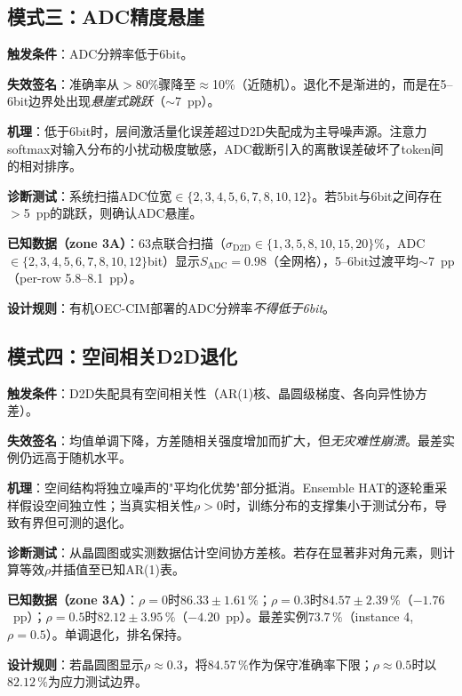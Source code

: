 \subsection{模式三：ADC精度悬崖}
\label{subsec:failure_adc_cliff}

\textbf{触发条件}：ADC分辨率低于6bit。

\textbf{失效签名}：准确率从$>$80\%骤降至$\approx$10\%（近随机）。退化不是渐进的，而是在5--6bit边界处出现\emph{悬崖式跳跃}（$\sim$7~pp）。

\textbf{机理}：低于6bit时，层间激活量化误差超过D2D失配成为主导噪声源。注意力softmax对输入分布的小扰动极度敏感，ADC截断引入的离散误差破坏了token间的相对排序。

\textbf{诊断测试}：系统扫描ADC位宽$\in\{2,3,4,5,6,7,8,10,12\}$。若5bit与6bit之间存在$>$5~pp的跳跃，则确认ADC悬崖。

\textbf{已知数据（zone 3A）}：63点联合扫描（$\sigma_{\mathrm{D2D}}\in\{1,3,5,8,10,15,20\}\%$，ADC$\in\{2,3,4,5,6,7,8,10,12\}$bit）显示$S_{\mathrm{ADC}}=0.98$（全网格），5--6bit过渡平均$\sim$7~pp（per-row 5.8--8.1~pp）。

\textbf{设计规则}：有机OEC-CIM部署的ADC分辨率\emph{不得低于6bit}。

\subsection{模式四：空间相关D2D退化}
\label{subsec:failure_correlated_d2d}

\textbf{触发条件}：D2D失配具有空间相关性（AR(1)核、晶圆级梯度、各向异性协方差）。

\textbf{失效签名}：均值单调下降，方差随相关强度增加而扩大，但\emph{无灾难性崩溃}。最差实例仍远高于随机水平。

\textbf{机理}：空间结构将独立噪声的"平均化优势"部分抵消。Ensemble HAT的逐轮重采样假设空间独立性；当真实相关性$\rho>0$时，训练分布的支撑集小于测试分布，导致有界但可测的退化。

\textbf{诊断测试}：从晶圆图或实测数据估计空间协方差核。若存在显著非对角元素，则计算等效$\rho$并插值至已知AR(1)表。

\textbf{已知数据（zone 3A）}：$\rho=0$时$86.33\pm1.61\,\%$；$\rho=0.3$时$84.57\pm2.39\,\%$（$-1.76$~pp）；$\rho=0.5$时$82.12\pm3.95\,\%$（$-4.20$~pp）。最差实例$73.7\,\%$（instance 4, $\rho=0.5$）。单调退化，排名保持。

\textbf{设计规则}：若晶圆图显示$\rho\approx0.3$，将$84.57\,\%$作为保守准确率下限；$\rho\approx0.5$时以$82.12\,\%$为应力测试边界。

